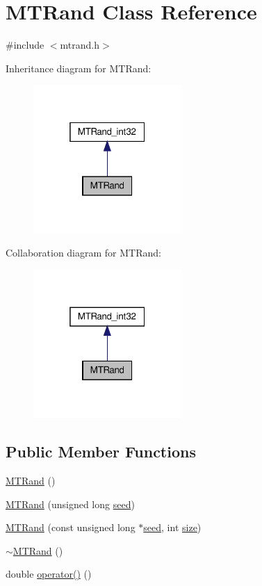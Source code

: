 \hypertarget{a00010}{\section{M\-T\-Rand Class Reference}
\label{a00010}
}


{\ttfamily \#include $<$mtrand.\-h$>$}



Inheritance diagram for M\-T\-Rand\-:\nopagebreak
\begin{figure}[H]
\begin{center}
\leavevmode
\includegraphics[width=160pt]{a00145}
\end{center}
\end{figure}


Collaboration diagram for M\-T\-Rand\-:\nopagebreak
\begin{figure}[H]
\begin{center}
\leavevmode
\includegraphics[width=160pt]{a00146}
\end{center}
\end{figure}
\subsection*{Public Member Functions}
\begin{DoxyCompactItemize}
\item 
\hyperlink{a00010_a265dc65546e26073c0d5f8787b045a1d}{M\-T\-Rand} ()
\item 
\hyperlink{a00010_a2c88736896bcbdb54bcdd7a0026720d5}{M\-T\-Rand} (unsigned long \hyperlink{a00013_a0c57076fe30358e0700a7ce1baa0ea27}{seed})
\item 
\hyperlink{a00010_a6075a3beacdfb8e4cf48d9fb56cc193a}{M\-T\-Rand} (const unsigned long $\ast$\hyperlink{a00013_a0c57076fe30358e0700a7ce1baa0ea27}{seed}, int \hyperlink{a00056_ae113ea7f9e515a12ac4b5595c6faf61e}{size})
\item 
\hyperlink{a00010_a8c276546a41ae350dc9efc5e9c10a261}{$\sim$\-M\-T\-Rand} ()
\item 
double \hyperlink{a00010_abbb87a08d622d58fdee0eea4cb5471a0}{operator()} ()
\end{DoxyCompactItemize}
